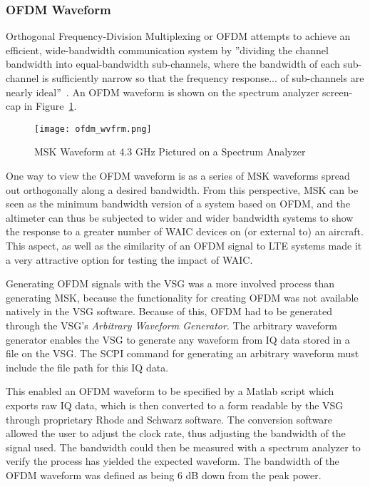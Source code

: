 \subsubsection{OFDM Waveform}\label{subsub:OFDM}

Orthogonal Frequency-Division Multiplexing or OFDM attempts to achieve an efficient, wide-bandwidth communication system by ''dividing the channel bandwidth into equal-bandwidth sub-channels, where the bandwidth of each sub-channel is sufficiently narrow so that the frequency response... of sub-channels are nearly ideal''~\cite{proakis_communication_2002}. An OFDM waveform is shown on the spectrum analyzer screen-cap in Figure~\ref{fig:OFDM}.
\begin{figure}[ht]
\centering
\texttt{[image: ofdm\_wvfrm.png]}
\caption[]{MSK Waveform at 4.3 GHz Pictured on a Spectrum Analyzer}

\label{fig:OFDM}

\end{figure}
One way to view the OFDM waveform is as a series of MSK waveforms spread out orthogonally along a desired bandwidth. From this perspective, MSK can be seen as the minimum bandwidth version of a system based on OFDM, and the altimeter can thus be subjected to wider and wider bandwidth systems to show the response to a greater number of WAIC devices on (or external to) an aircraft. This aspect, as well as the similarity of an OFDM signal to LTE systems made it a very attractive option for testing the impact of WAIC. 

Generating OFDM signals with the VSG was a more involved process than generating MSK, because the functionality for creating OFDM was not available natively in the VSG software. Because of this, OFDM had to be generated through the VSG's \textit{Arbitrary Waveform Generator}. The arbitrary waveform generator enables the VSG to generate any waveform from IQ data stored in a file on the VSG. The SCPI command for generating an arbitrary waveform must include the file path for this IQ data.  

This enabled an OFDM waveform to be specified by a Matlab script which exports raw IQ data, which is then converted to a form readable by the VSG through proprietary Rhode and Schwarz software. The conversion software allowed the user to adjust the clock rate, thus adjusting the bandwidth of the signal used. The bandwidth could then be measured with a spectrum analyzer to verify the process has yielded the expected waveform. The bandwidth of the OFDM waveform was defined as being 6 dB down from the peak power. 



